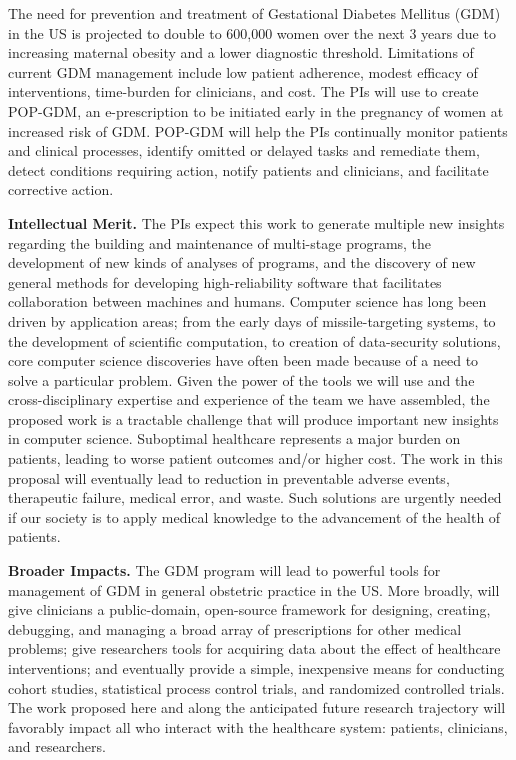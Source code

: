 \documentclass[11pt]{article}
\begin{document}
The need for prevention and treatment of Gestational Diabetes Mellitus
(GDM) in the US is projected to double to 600,000 women over the next
3 years due to increasing maternal obesity and a lower diagnostic
threshold.
%
Limitations of current GDM management include low patient adherence,
modest efficacy of interventions, time-burden for clinicians, and
cost.
%
The PIs will use \poppl{} to create POP-GDM, an e-prescription to be
initiated early in the pregnancy of women at increased risk of GDM.
%
POP-GDM will help the PIs continually monitor patients and clinical
processes, identify omitted or delayed tasks and remediate them,
detect conditions requiring action, notify patients and clinicians,
and facilitate corrective action.

\noindent
\textbf{Intellectual Merit.}  
%
The PIs expect this work to generate multiple new insights regarding the
building and maintenance of multi-stage programs, the development of
new kinds of analyses of programs, and the discovery of new general
methods for developing high-reliability software that facilitates
collaboration between machines and humans.
%
Computer science has long been driven by application areas; from the
early days of missile-targeting systems, to the development of
scientific computation, to creation of data-security solutions, core
computer science discoveries have often been made because of a need to
solve a particular problem.
%
Given the power of the tools we will use and the cross-disciplinary
expertise and experience of the team we have assembled, the proposed
work is a tractable challenge that will produce important new insights
in computer science.
%
Suboptimal healthcare represents a major burden on patients, leading
to worse patient outcomes and/or higher cost. 
%
The work in this proposal will eventually lead to reduction in
preventable adverse events, therapeutic failure, medical error, and
waste. 
%
Such solutions are urgently needed if our society is to apply medical
knowledge to the advancement of the health of patients.

\noindent
\textbf{Broader Impacts.} The GDM \poppl{} program will lead
to powerful tools for management of GDM in general obstetric practice
in the US.
%
More broadly, \poppl{} will give clinicians a public-domain,
open-source framework for designing, creating, debugging, and managing
a broad array of prescriptions for other medical problems; give
researchers tools for acquiring data about the effect of healthcare
interventions; and eventually provide a simple, inexpensive means for
conducting cohort studies, statistical process control trials, and
randomized controlled trials.
%
The work proposed here and along the anticipated future research
trajectory will favorably impact all who interact with the healthcare
system: patients, clinicians, and researchers.
\end{document}
